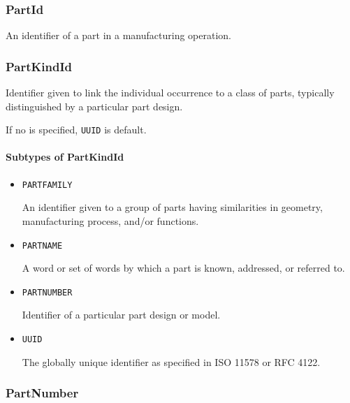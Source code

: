 \subsubsection{PartId}
\label{sec:PartId}



An identifier of a part in a manufacturing operation.


\subsubsection{PartKindId}
\label{sec:PartKindId}



Identifier given to link the individual occurrence to a class of parts, typically distinguished by a particular part design. 

If no  is specified, \texttt{UUID} is default.



\paragraph{Subtypes of PartKindId}\mbox{}
\label{sec:Subtypes of PartKindId}

\begin{itemize}

\item \texttt{PART\textunderscore FAMILY}


An identifier given to a group of parts having similarities in geometry, manufacturing process, and/or functions.

\item \texttt{PART\textunderscore NAME}


A word or set of words by which a part is known, addressed, or referred to.

\item \texttt{PART\textunderscore NUMBER}


Identifier of a particular part design or model.

\item \texttt{UUID}


The globally unique identifier as specified in ISO 11578 or RFC 4122.


\end{itemize}

\subsubsection{PartNumber}
\label{sec:PartNumber}



